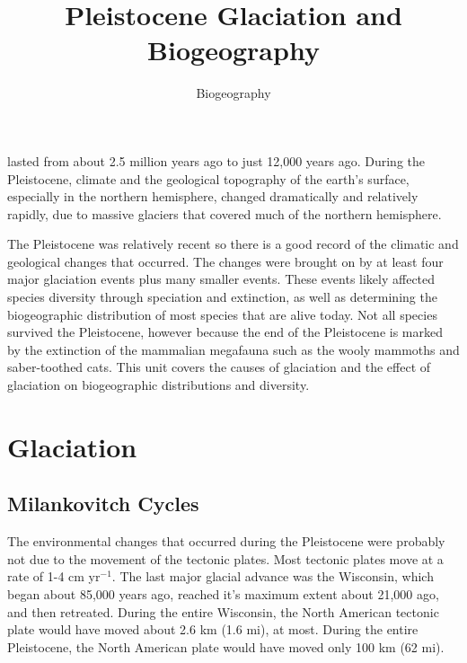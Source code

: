 \documentclass{tufte-handout}
\title{Pleistocene Glaciation and Biogeography}
\author[Biogeography]{Biogeography}
\date{} %
\begin{document}
\maketitle%



 lasted from about 2.5 million years ago to just 12,000 years ago.  During the Pleistocene, climate and the geological topography of the earth's surface, especially in the northern hemisphere, changed dramatically and relatively rapidly, due to massive glaciers  that covered much of the northern hemisphere.  

The Pleistocene was relatively recent so there is a good record of the climatic and geological changes that occurred. The changes were brought on by at least four major glaciation events plus many smaller events.  These events likely affected species diversity through speciation and extinction, as well as determining the biogeographic distribution of most species that are alive today.  Not all species survived the Pleistocene, however because the end of the Pleistocene is marked by the extinction of the mammalian megafauna such as the wooly mammoths and saber-toothed cats.  This unit covers the causes of glaciation and the effect of glaciation on biogeographic distributions and diversity.

\section{Glaciation}\label{sec:glaciation}
\subsection{Milankovitch Cycles}\label{sec:milankovitch}

The environmental changes that occurred during the Pleistocene were probably not due to the movement of the tectonic plates. Most tectonic plates move at a rate of  1-4 cm yr$^{-1}$.  The last major glacial advance was the Wisconsin, which began about 85,000 years ago, reached it's maximum extent about 21,000 ago, and then retreated. During the entire Wisconsin, the North American tectonic plate would have moved about 2.6 km (1.6 mi), at most.  During the entire Pleistocene, the North American plate would have moved only 100 km (62 mi). 
\end{document}
